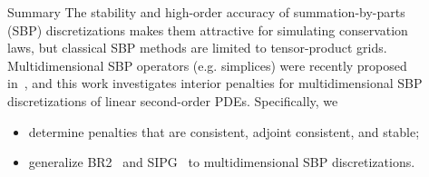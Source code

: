 \documentclass[final]{beamer}
\newlength{\sepwid}
\newlength{\firstcolwid}
\begin{document}
\begin{frame}[t]   %
\begin{columns}[t] %

\begin{column}{\sepwid}\end{column} %
\begin{column}{\sepwid}\end{column} %

\begin{column}{\firstcolwid} %

\begin{block}{\centering\LARGE Summary} \normalfont
    The stability and high-order accuracy of summation-by-parts (SBP) discretizations makes them attractive for simulating conservation laws, but classical SBP methods are limited to tensor-product grids.
    Multidimensional SBP operators (e.g. simplices) were recently proposed in~\cite{multiSBP}, and this work  investigates interior penalties for multidimensional SBP discretizations of linear second-order PDEs. Specifically, we
    \begin{itemize}
        \setlength{\itemindent}{0em}
        \item determine penalties 
        that are consistent, adjoint consistent, and stable;
        \item generalize BR2~\cite{Bassi2005} and SIPG~\cite{Arnold2002} to 
        multidimensional SBP discretizations.
    \end{itemize}

\end{block} %


\end{column}
\end{columns}
\end{frame}
\end{document}
